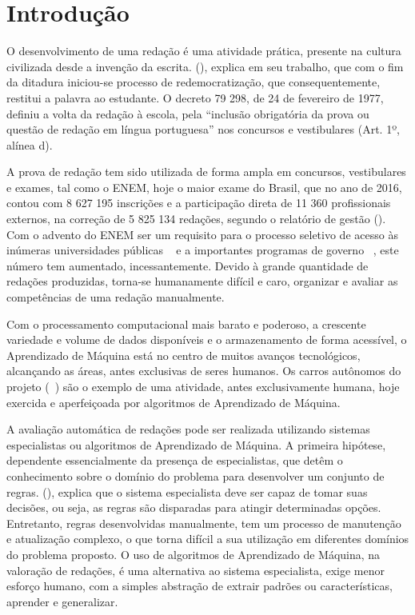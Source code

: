 \newpage
\section{Introdução}

O desenvolvimento de uma redação é uma atividade prática, presente na 
cultura civilizada desde a invenção da escrita.  
(\citeyear{lara:1995}), explica em seu trabalho, que com o fim da ditadura 
iniciou-se processo de redemocratização, que consequentemente, restitui a 
palavra ao estudante. O decreto 79 298, de 24 de fevereiro de 1977, definiu a 
volta da redação à escola, pela ``inclusão obrigatória da prova ou questão de 
redação em língua portuguesa'' nos concursos e vestibulares 
(Art. 1º, alínea d).

A prova de redação tem sido utilizada de forma ampla em concursos, vestibulares 
e exames, tal como o ENEM, hoje o maior exame do Brasil, que no ano de 2016, 
contou com 8 627 195 inscrições e a participação direta de 11 360 profissionais 
externos, na correção de 5 825 134 redações, segundo o relatório de gestão 
\citeauthor{relatorio_de_gestao:2016} (\citeyear{relatorio_de_gestao:2016}). 
Com o advento do ENEM ser um requisito para o processo seletivo de acesso às 
inúmeras universidades públicas ~\cite{sisu:2017} e a importantes programas de 
governo ~\cite{csf:2017}, este número tem aumentado, incessantemente. Devido à 
grande quantidade de redações produzidas, torna-se humanamente difícil e caro, 
organizar e avaliar as competências de uma redação manualmente.

Com o processamento computacional mais barato e poderoso, a crescente variedade 
e volume de dados disponíveis e o armazenamento de forma acessível, o 
Aprendizado de Máquina está no centro de muitos avanços tecnológicos, 
alcançando as áreas, antes exclusivas de seres humanos. Os carros autônomos do
projeto \citeauthor{waymo:2017} (~\citeyear{waymo:2017}) são o exemplo de uma 
atividade, antes exclusivamente humana, hoje exercida e aperfeiçoada por 
algoritmos de Aprendizado de Máquina. 

A avaliação automática de redações pode ser realizada utilizando sistemas
especialistas ou algoritmos de Aprendizado de Máquina. A primeira hipótese, 
dependente essencialmente da presença de especialistas, que detêm o 
conhecimento sobre o domínio do problema para desenvolver um conjunto de 
regras.  
(\citeyear{negnevitsky2005artificial}), explica que o sistema especialista deve 
ser capaz de tomar suas decisões, ou seja, as regras são disparadas para 
atingir determinadas opções. Entretanto, regras desenvolvidas manualmente, 
tem um processo de manutenção e atualização complexo, o que torna difícil a sua 
utilização em diferentes domínios do problema proposto. O uso de algoritmos de 
Aprendizado de Máquina, na valoração de redações, é uma alternativa ao sistema 
especialista, exige menor esforço humano, com a simples abstração de extrair 
padrões ou características, aprender e generalizar. 

